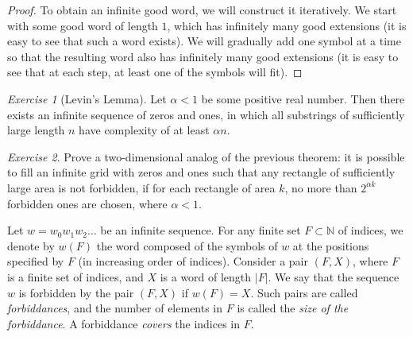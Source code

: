 \documentclass[12pt,sans]{article}
\theoremstyle{definition}
\theoremstyle{plain}
\theoremstyle{remark}
\newtheorem{exercise}{Exercise}[section]
\begin{document}
\begin{proof}
    To obtain an infinite good word, we will construct it iteratively.
    We start with some good word of length $1$, which has infinitely many
    good extensions (it is easy to see that such a word exists). We will gradually add
    one symbol at a time so that the resulting word also has infinitely many
    good extensions (it is easy to see that at each step, at least one of the symbols will fit).
\end{proof}

\begin{exercise}[Levin's Lemma]
    Let $\alpha < 1$ be some positive real number.
    Then there exists an infinite sequence of zeros and ones,
    in which all substrings of sufficiently large length $n$ have complexity
    of at least $\alpha n$.
\end{exercise}

\begin{exercise}\label{ex:lll:rects}
    Prove a two-dimensional analog of the previous theorem: it is possible to fill an infinite
    grid with zeros and ones such that any rectangle of sufficiently large area is not forbidden, if for each
    rectangle of area $k$, no more than $2^{\alpha k}$ forbidden ones are chosen,
    where $\alpha < 1$.
\end{exercise}

Let $w=w_0w_1w_2\dotso$ be an infinite sequence. For any finite
set $F\subset\mathbb{N}$ of indices, we denote by $w(F)$ the word composed
of the symbols of $w$ at the positions specified by $F$ (in increasing order of indices). Consider a pair $(F, X)$,
where $F$ is a finite set of indices, and $X$ is a word of length $|F|$. We say that
the sequence $w$ is forbidden by the pair $(F,X)$ if $w(F) = X$. Such pairs
are called \emph{forbiddances}, and the number of elements in $F$ is called the \emph{size of the forbiddance}. A forbiddance \emph{covers} the indices in $F$.
\end{document}
